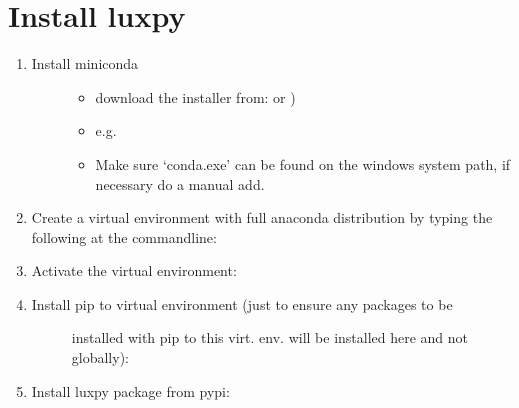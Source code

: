 \documentclass[letterpaper,10pt,english]{sphinxmanual}
\begin{document}
\section{Install luxpy}
\label{\detokenize{installation:install-luxpy}}\begin{enumerate}
\item {} \begin{description}
\item[{Install miniconda}] \leavevmode\begin{itemize}
\item {} 
download the installer from: 
or )

\item {} 
e.g. 

\item {} 
Make sure ‘conda.exe’ can be found on the windows system path, if necessary do a manual add.

\end{itemize}

\end{description}

\item {} 
Create a virtual environment with full anaconda distribution by typing the following at the commandline:
\begin{quote}

\end{quote}

\item {} 
Activate the virtual environment:
\begin{quote}

\end{quote}

\item {} \begin{description}
\item[{Install pip to virtual environment (just to ensure any packages to be}] \leavevmode
installed with pip to this virt. env. will be installed here and not globally):


\end{description}

\item {} 
Install luxpy package from pypi:
\begin{quote}

\end{quote}

\end{enumerate}
\end{document}
